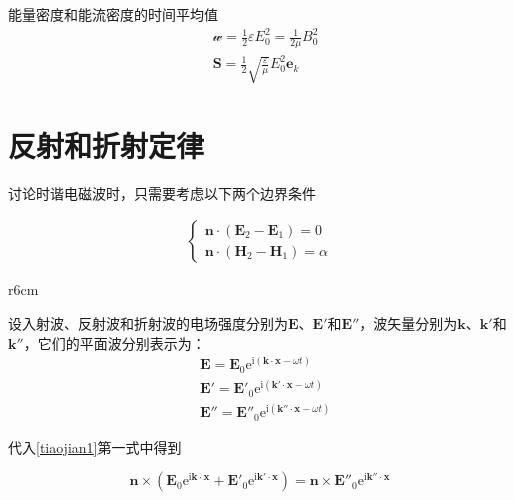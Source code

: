 \documentclass[main.tex]{subfiles}
\begin{document}
能量密度和能流密度的时间平均值
\begin{align}
    &\mathscr{w} = \frac{1}{2} \varepsilon E_0^2 =\frac{1}{2\mu}B_0^2\\
    &\boldsymbol{S} =\frac{1}{2} \sqrt{\frac{\varepsilon}{\mu}}E_0^2 \boldsymbol{e}_k
\end{align}

\section{反射和折射定律}

讨论时谐电磁波时，只需要考虑以下两个边界条件

\begin{align}
\label{tiaojian1}\left\{\begin{array}{l}
\boldsymbol{n} \cdot (\boldsymbol{E}_2 - \boldsymbol{E}_1) = 0 \\
\boldsymbol{n} \cdot (\boldsymbol{H}_2 - \boldsymbol{H}_1) = \alpha 
\end{array}\right.
\end{align}

\begin{wrapfigure}{r}{6cm}
	\centering	
\end{wrapfigure}

设入射波、反射波和折射波的电场强度分别为$\boldsymbol{E}$、$\boldsymbol{E}'$和$\boldsymbol{E}''$，波矢量分别为$\boldsymbol{k}$、$\boldsymbol{k}'$和$\boldsymbol{k}''$，它们的平面波分别表示为：
\begin{align}
    &\boldsymbol{E} = \boldsymbol{E}_0\mathrm{e}^{\mathrm{i}(\boldsymbol{k} \cdot \boldsymbol{x} - \omega t)}\\
    &\boldsymbol{E}' = \boldsymbol{E}'_0\mathrm{e}^{\mathrm{i}(\boldsymbol{k}' \cdot \boldsymbol{x} - \omega t)}\\
    &\boldsymbol{E}'' = \boldsymbol{E}''_0\mathrm{e}^{\mathrm{i}(\boldsymbol{k}'' \cdot \boldsymbol{x} - \omega t)}
\end{align}

代入\ref{tiaojian1}第一式中得到

\begin{equation}
    \boldsymbol{n} \times (\boldsymbol{E}_0 \mathrm{e}^{\mathrm{i} \boldsymbol{k} \cdot \boldsymbol{x}} +\boldsymbol{E}'_0 \mathrm{e}^{\mathrm{i} \boldsymbol{k}' \cdot \boldsymbol{x}}) = \boldsymbol{n} \times \boldsymbol{E}''_0 \mathrm{e}^{\mathrm{i} \boldsymbol{k}'' \cdot \boldsymbol{x}}
\end{equation}
\end{document}
